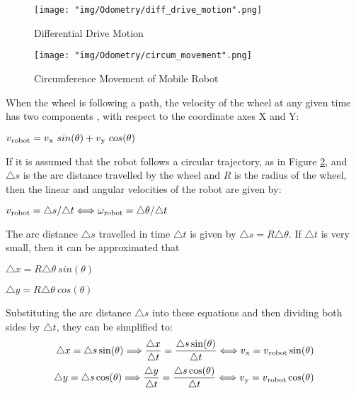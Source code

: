 \begin{figure}[htbp]
    \centering
    \texttt{[image: "img/Odometry/diff\_drive\_motion".png]} 
    \caption{Differential Drive Motion}
    \label{fig:diffdrivefig}
\end{figure}
\begin{figure}[htbp]
    \centering
    \texttt{[image: "img/Odometry/circum\_movement".png]} 
    \caption{Circumference Movement of Mobile Robot}
    \label{fig:circummovefig}
\end{figure}

When the wheel is following a path, the velocity of the wheel at any given time has two components \cite{salem_2013}, with respect to the coordinate axes X and Y: 
\begin{center}
$v\textsubscript{robot} = v\textsubscript{x} \ sin(\theta) + v\textsubscript{y} \ cos(\theta)$    
\end{center}
If it is assumed that the robot follows a circular trajectory, as in Figure \ref{fig:circummovefig}, and $\triangle s$ is the arc distance travelled by the wheel and $R$ is the radius of the wheel, then the linear and angular velocities of the robot are given by:
\begin{center}
$v\textsubscript{robot} = \triangle s / \triangle t \Longleftrightarrow \omega\textsubscript{robot} = \triangle\theta / \triangle t$
\end{center}
The arc distance $\triangle s$ travelled in time $\triangle t$ is given by $\triangle s = R \triangle\theta$. If $\triangle t$ is very small, then it can be approximated that
\begin{center}
$\triangle x = R\triangle\theta \ sin(\theta)$

$\triangle y = R\triangle\theta \ cos(\theta)$
\end{center}
Substituting the arc distance $\triangle s$ into these equations and then dividing both sides by $\triangle t$, they can be simplified to:
\begin{equation}\label{changeinxyapprox}
\begin{split}
    \triangle x = \triangle s \sin(\theta) \Longrightarrow \frac{\triangle x}{\triangle t} = \frac{\triangle s \sin(\theta)}{\triangle t} \Longleftrightarrow v\textsubscript{x} = v\textsubscript{robot} \sin(\theta) \\
    \triangle y = \triangle s \cos(\theta) \Longrightarrow \frac{\triangle y}{\triangle t} = \frac{\triangle s \cos(\theta)}{\triangle t} \Longleftrightarrow v\textsubscript{y} = v\textsubscript{robot} \cos(\theta)
\end{split}
\end{equation}

